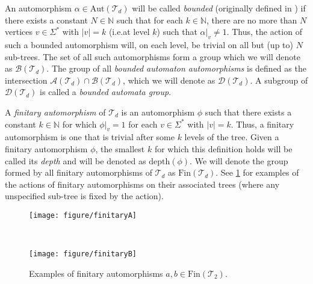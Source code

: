 An automorphism $\alpha \in \mathrm{Aut}(\mathcal{T}_d)$ will be called \emph{bounded} (originally defined in \cite{sidki2000}) if there exists a constant $N \in \mathbb{N}$ such that for each $k\in \mathbb{N}$, there are no more than $N$ vertices $v\in \Sigma^*$ with $\left\vert v \right\vert = k$ (i.e.\@ at level $k$) such that $\left.\alpha\right\vert_v \neq 1$.
Thus, the action of such a bounded automorphism will, on each level, be trivial on all but (up to) $N$ sub-trees.
The set of all such automorphisms form a group which we will denote as $\mathcal{B}(\mathcal{T}_d)$.
The group of all \emph{bounded automaton automorphisms} is defined as the intersection $\mathcal{A}(\mathcal{T}_d) \cap \mathcal{B}(\mathcal{T}_d)$, which we will denote as $\mathcal{D}(\mathcal{T}_d)$.
A subgroup of $\mathcal{D}(\mathcal{T}_d)$ is called a  \emph{bounded automata group}.

A \emph{finitary automorphism} of $\mathcal{T}_d$ is an automorphism $\phi$ such that there exists a constant $k \in \mathbb{N}$ for which $\left. \phi \right\vert_v = 1$ for each $v \in \Sigma^*$ with $\left\vert v \right\vert = k$.
Thus, a finitary automorphism is one that is trivial after some $k$ levels of the tree.
Given a finitary automorphism $\phi$, the smallest $k$ for which this definition holds will be called its \emph{depth} and will be denoted as $\mathrm{depth}(\phi)$.
We will denote the group formed by all finitary automorphisms of $\mathcal{T}_d$ as $\mathrm{Fin}(\mathcal{T}_d)$.
See \cref{fig:finitary examples} for examples of the actions of finitary automorphisms on their associated trees (where any unspecified sub-tree is fixed by the action).

\begin{figure}[!ht]
	\centering
	\begin{minipage}[t]{.3\linewidth}
		\centering
		\texttt{[image: figure/finitaryA]}
	\end{minipage}
	~
	\begin{minipage}[t]{.3\linewidth}
		\centering
		\texttt{[image: figure/finitaryB]}
	\end{minipage}
	\caption{Examples of finitary automorphisms $a,b\in\mathrm{Fin}\!\left(\mathcal{T}_2\right)$.}
	\label{fig:finitary examples}
\end{figure}

